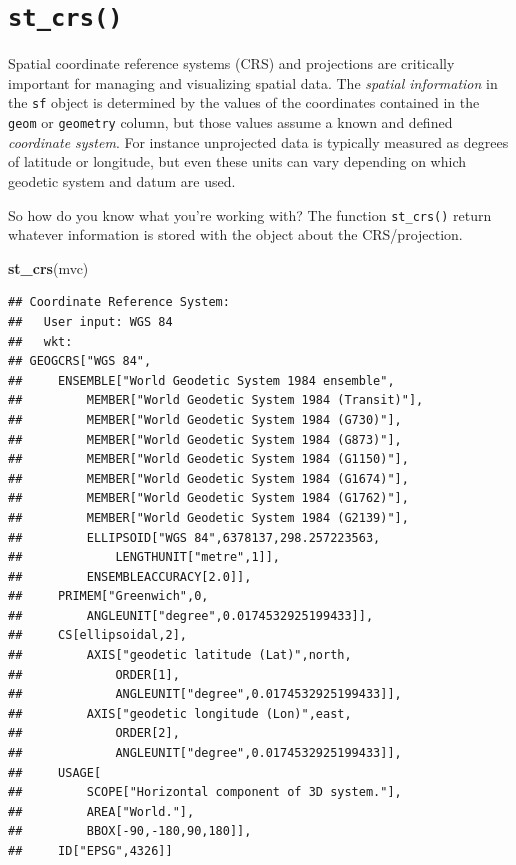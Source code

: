 \documentclass[
]{book}
\newenvironment{Shaded}{\begin{snugshade}}{\end{snugshade}}
\newcommand{\FunctionTok}[1]{\textcolor[rgb]{0.13,0.29,0.53}{\textbf{#1}}}
\newcommand{\NormalTok}[1]{#1}
\begin{document}
\hypertarget{st_crs}{%
\section{\texorpdfstring{\texttt{st\_crs()}}{st\_crs()}}\label{st_crs}}

Spatial coordinate reference systems (CRS) and projections are critically important for managing and visualizing spatial data. The \emph{spatial information} in the \texttt{sf} object is determined by the values of the coordinates contained in the \texttt{geom} or \texttt{geometry} column, but those values assume a known and defined \emph{coordinate system}. For instance unprojected data is typically measured as degrees of latitude or longitude, but even these units can vary depending on which geodetic system and datum are used.

So how do you know what you're working with? The function \texttt{st\_crs()} return whatever information is stored with the object about the CRS/projection.

\begin{Shaded}
\begin{Highlighting}[]
\FunctionTok{st\_crs}\NormalTok{(mvc)}
\end{Highlighting}
\end{Shaded}

\begin{verbatim}
## Coordinate Reference System:
##   User input: WGS 84 
##   wkt:
## GEOGCRS["WGS 84",
##     ENSEMBLE["World Geodetic System 1984 ensemble",
##         MEMBER["World Geodetic System 1984 (Transit)"],
##         MEMBER["World Geodetic System 1984 (G730)"],
##         MEMBER["World Geodetic System 1984 (G873)"],
##         MEMBER["World Geodetic System 1984 (G1150)"],
##         MEMBER["World Geodetic System 1984 (G1674)"],
##         MEMBER["World Geodetic System 1984 (G1762)"],
##         MEMBER["World Geodetic System 1984 (G2139)"],
##         ELLIPSOID["WGS 84",6378137,298.257223563,
##             LENGTHUNIT["metre",1]],
##         ENSEMBLEACCURACY[2.0]],
##     PRIMEM["Greenwich",0,
##         ANGLEUNIT["degree",0.0174532925199433]],
##     CS[ellipsoidal,2],
##         AXIS["geodetic latitude (Lat)",north,
##             ORDER[1],
##             ANGLEUNIT["degree",0.0174532925199433]],
##         AXIS["geodetic longitude (Lon)",east,
##             ORDER[2],
##             ANGLEUNIT["degree",0.0174532925199433]],
##     USAGE[
##         SCOPE["Horizontal component of 3D system."],
##         AREA["World."],
##         BBOX[-90,-180,90,180]],
##     ID["EPSG",4326]]
\end{verbatim}
\end{document}
